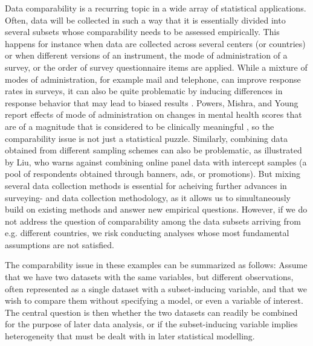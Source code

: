 \documentclass[]{interact}
\theoremstyle{plain}%
\theoremstyle{definition}
\theoremstyle{remark}
\begin{document}
Data comparability is a recurring topic in a wide array of statistical applications. Often, data will be collected in such a way that it is essentially divided into several subsets whose comparability needs to be assessed empirically. This happens for instance when data are collected across several centers (or countries) or when different versions of an instrument, the mode of administration of a survey, or the order of survey questionnaire items are applied. While a mixture of modes of administration, for example mail and telephone, can improve response rates in surveys, it can also be quite problematic by inducing differences in response behavior that may lead to biased results \cite{Brambilla1987,McHorney1994}. Powers, Mishra, and Young report effects of mode of administration on changes in mental health scores that are of a magnitude that is considered to be clinically meaningful \cite{Powers2005}, so the comparability issue is not just a statistical puzzle. Similarly, combining data obtained from different sampling schemes can also be problematic, as illustrated by Liu, who warns against combining online panel data with intercept samples (a pool of respondents obtained through banners, ads, or promotions)\cite{Liu2016}. But mixing several data collection methods is essential for acheiving further advances in surveying- and data collection methodology, as it allows us to simultaneously build on existing methods and answer new empirical questions. However, if we do not address the question of comparability among the data subsets arriving from e.g. different countries, we risk conducting analyses whose most fundamental assumptions are not satisfied.

The comparability issue in these examples can be summarized as follows: Assume that we have two datasets with the same variables, but different observations, often represented as a single dataset with a subset-inducing variable, and that we wish to compare them without specifying a model, or even a variable of interest. The central question is then whether the two datasets can readily be combined for the purpose of later data analysis, or if the subset-inducing variable implies heterogeneity that must be dealt with in later statistical modelling.
\end{document}
